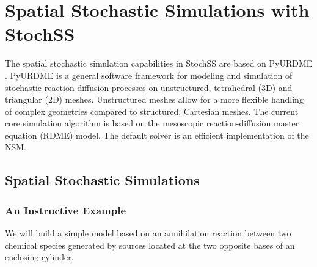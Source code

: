 \chapter{Spatial Stochastic Simulations with StochSS}




The spatial stochastic simulation capabilities in StochSS are based on PyURDME \cite{urdme}. PyURDME is a general software framework for modeling and simulation of stochastic reaction-diffusion processes on unstructured, tetrahedral (3D) and triangular (2D) meshes. Unstructured meshes allow for a more flexible handling of complex geometries compared to structured, Cartesian meshes. The current core simulation algorithm is based on the mesoscopic reaction-diffusion master equation (RDME) model. The default solver is an efficient implementation of the NSM.

\section{Spatial Stochastic Simulations}

\subsection{An Instructive Example}
We will build a simple model based on an annihilation reaction between two chemical species generated  by sources located at the two opposite bases of an enclosing cylinder.

